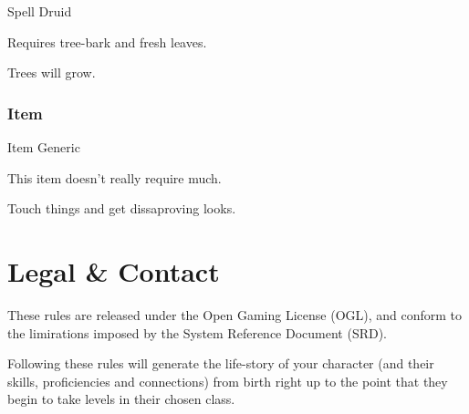 \documentclass[10pt,twoside]{article}
\begin{document}
\begin{multicols}{2}
\begin{spellbox}{Spell Druid}
    \spelldetails[%
    level   = 9,
    school  = Transmutation,
    time    = 1 action,
    range   = Touch,
    duration = Instant,
    components = {S,M},
    restrict = Druid,
    ritual = yes
    ]
    \begin{spellaction}[Materials]
    Requires tree-bark and fresh leaves.
    \end{spellaction}

    \begin{spellaction}[Effect]
    Trees will grow.
    \end{spellaction}
\end{spellbox}

\subsubsection*{Item}

\begin{itembox}{Item Generic}
    \itemdetails[]
    \begin{itemaction}[Materials]
    This item doesn't really require much.
    \end{itemaction}

    \begin{itemaction}[Effect]
    Touch things and get dissaproving looks.
    \end{itemaction}
\end{itembox}

\section{Legal \& Contact}
These rules are released under the Open Gaming License (OGL), and conform to the limirations imposed by the System Reference Document (SRD).


Following these rules will generate the life-story of your character (and their skills, proficiencies and connections) from birth right up to the point that they begin to take levels in their chosen class.
\end{multicols}
\end{document}
